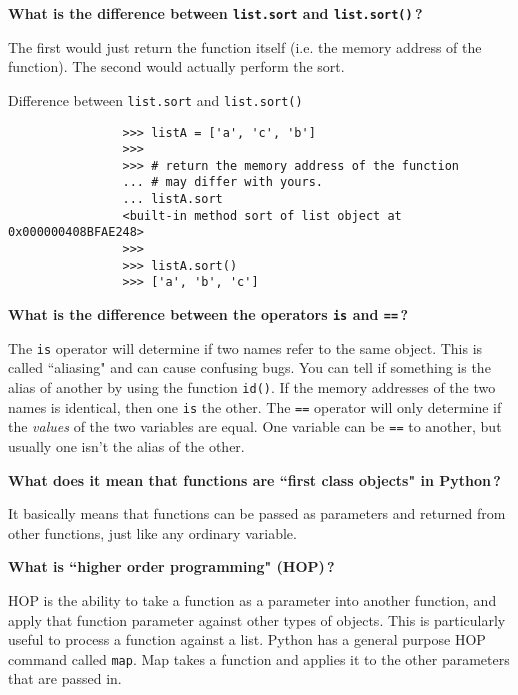 \documentclass{article}
\newcommand{\inlinecode}[1]{\texttt{#1}}
\newcommand{\question}[1]{\item[$\bullet$] 
	\begin{minipage}[t]{\textwidth}
		\bfseries#1
	\end{minipage}
	\hfil
}
\newenvironment{answer}{}{}
\newenvironment{faq}{\begin{description}}{\end{description}}
\begin{document}
\begin{faq}
\begin{answer}
		\end{answer}
		
		\question{What is the difference between \inlinecode{list.sort} and \inlinecode{list.sort()}\,?}
		\begin{answer}
			The first would just return the function itself (i.e. the memory address of the function). The second would actually perform the sort.
			
			\begin{table}[hbp]
				\caption{Difference between \texttt{list.sort} and \texttt{list.sort()}}
				\begin{verbatim}
				>>> listA = ['a', 'c', 'b']
				>>>
				>>> # return the memory address of the function
				... # may differ with yours.
				... listA.sort
				<built-in method sort of list object at 0x000000408BFAE248>
				>>>
				>>> listA.sort()
				>>> ['a', 'b', 'c']
				\end{verbatim}
			\end{table}
		\end{answer}
		
		\question{What is the difference between the operators \inlinecode{is} and \inlinecode{==}\,?}
		\begin{answer}
			The \inlinecode{is} operator will determine if two names refer to the same object. This is called ``aliasing" and can cause confusing bugs. You can tell if something is the alias of another by using the function \inlinecode{id()}. If the memory addresses of the two names is identical, then one \inlinecode{is} the other. The \inlinecode{==} operator will only determine if the \textit{values} of the two variables are equal. One variable can be \inlinecode{==} to another, but usually one isn't the alias of the other.
		\end{answer}
		
		\question{What does it mean that functions are ``first class objects" in Python\,?}
		\begin{answer}
			It basically means that functions can be passed as parameters and returned from other functions, just like any ordinary variable.
		\end{answer}
		
		\question{What is ``higher order programming" (HOP)\,?}
		\begin{answer}
			HOP is the ability to take a function as a parameter into another function, and apply that function parameter against other types of objects.  This is particularly useful to process a function against a list. Python has a general purpose HOP command called \inlinecode{map}. Map takes a function and applies it to the other parameters that are passed in.
		\end{answer}
		

\end{faq}
\end{document}
